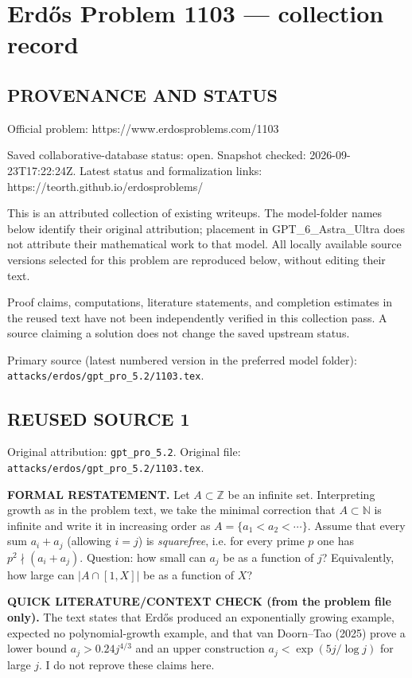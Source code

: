 \section*{Erd\H{o}s Problem 1103 --- collection record}

\subsection*{PROVENANCE AND STATUS}
Official problem: https://www.erdosproblems.com/1103

Saved collaborative-database status: open.
Snapshot checked: 2026-09-23T17:22:24Z.
Latest status and formalization links: https://teorth.github.io/erdosproblems/

This is an attributed collection of existing writeups. The model-folder names below identify their original attribution; placement in GPT\_6\_Astra\_Ultra does not attribute their mathematical work to that model. All locally available source versions selected for this problem are reproduced below, without editing their text.

Proof claims, computations, literature statements, and completion estimates in the reused text have not been independently verified in this collection pass. A source claiming a solution does not change the saved upstream status.

Primary source (latest numbered version in the preferred model folder): \texttt{attacks/erdos/gpt\_pro\_5.2/1103.tex}.

\subsection*{REUSED SOURCE 1}
Original attribution: \texttt{gpt\_pro\_5.2}.
Original file: \texttt{attacks/erdos/gpt\_pro\_5.2/1103.tex}.


\noindent\textbf{FORMAL RESTATEMENT.}
Let $A\subset\mathbb Z$ be an infinite set.
Interpreting growth as in the problem text, we take the minimal correction that $A\subset\mathbb N$ is infinite and write it in increasing order as $A=\{a_1<a_2<\cdots\}$.
Assume that every sum $a_i+a_j$ (allowing $i=j$) is \emph{squarefree}, i.e. for every prime $p$ one has $p^2\nmid (a_i+a_j)$.
Question: how small can $a_j$ be as a function of $j$? Equivalently, how large can $|A\cap[1,X]|$ be as a function of $X$?

\medskip
\noindent\textbf{QUICK LITERATURE/CONTEXT CHECK (from the problem file only).}
The text states that Erd\H{o}s produced an exponentially growing example, expected no polynomial-growth example, and that van Doorn--Tao (2025) prove a lower bound $a_j>0.24j^{4/3}$ and an upper construction $a_j<\exp(5j/\log j)$ for large $j$.
I do not reprove these claims here.

